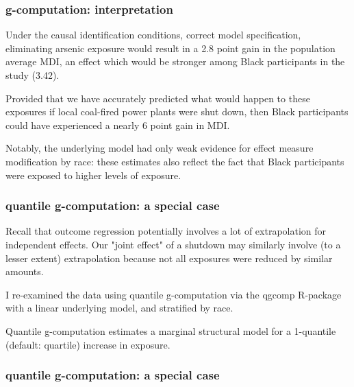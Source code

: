 \begin{frame}[t, fragile]
  \frametitle{g-computation: interpretation}
  Under the causal identification conditions, correct model specification, eliminating arsenic exposure would result in a 2.8 point gain in the population average MDI, an effect which would be stronger among Black participants in the study (3.42).
  \bigskip
  
  Provided that we have accurately predicted what would happen to these exposures if local coal-fired power plants were shut down, then Black participants could have experienced a nearly 6 point gain in MDI.
  \bigskip
  
  Notably, the underlying model had only weak evidence for effect measure modification by race: these estimates also reflect the fact that Black participants were exposed to higher levels of exposure.
 \end{frame}

\begin{frame}[t, fragile]
  \frametitle{quantile g-computation: a special case}
  Recall that outcome regression potentially involves a lot of extrapolation for independent effects. Our "joint effect" of a shutdown may similarly involve (to a lesser extent) extrapolation because not all exposures were reduced by similar amounts.
  
  \bigskip
  I re-examined the data using quantile g-computation via the qgcomp R-package with a linear underlying model, and stratified by race. 
  
  \bigskip
  Quantile g-computation estimates a marginal structural model for a 1-quantile (default: quartile) increase in exposure.

 \end{frame}

\begin{frame}[t, fragile]
  \frametitle{quantile g-computation: a special case}
  

 \end{frame}



